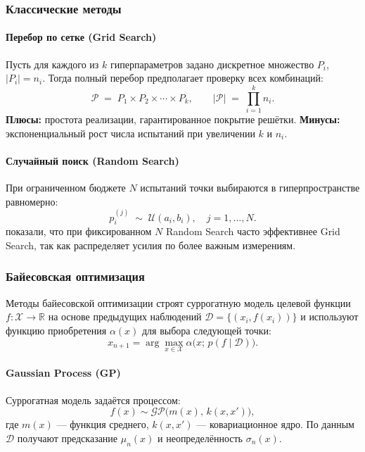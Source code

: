 \subsubsection{Классические методы}

\paragraph{Перебор по сетке (Grid Search)}  
Пусть для каждого из \(k\) гиперпараметров задано дискретное множество \(P_i\), \(|P_i|=n_i\). Тогда полный перебор предполагает проверку всех комбинаций:
\begin{equation}
\mathcal{P} \;=\; P_1 \times P_2 \times \cdots \times P_k,
\qquad
|\mathcal{P}| \;=\; \prod_{i=1}^k n_i.
\label{eq:grid-search-size}
\end{equation}
\textbf{Плюсы:} простота реализации, гарантированное покрытие решётки.  
\textbf{Минусы:} экспоненциальный рост числа испытаний при увеличении \(k\) и \(n_i\).

\paragraph{Случайный поиск (Random Search)}  
При ограниченном бюджете \(N\) испытаний точки выбираются в гиперпространстве равномерно:
\begin{equation}
p_i^{(j)} \;\sim\; \mathcal{U}(a_i, b_i),
\quad j = 1,\dots,N.
\label{eq:random-search}
\end{equation}
\citet{bergstra2012random} показали, что при фиксированном \(N\) Random Search часто эффективнее Grid Search, так как распределяет усилия по более важным измерениям.

\subsubsection{Байесовская оптимизация}

Методы байесовской оптимизации строят суррогатную модель целевой функции
\(
f\colon \mathcal{X}\to\mathbb{R}
\)
на основе предыдущих наблюдений \(\mathcal{D}=\{(x_i, f(x_i))\}\) и используют функцию приобретения \(\alpha(x)\) для выбора следующей точки:
\begin{equation}
x_{n+1} = \arg\max_{x\in\mathcal{X}} \alpha\bigl(x;\,p(f\mid\mathcal{D})\bigr).
\label{eq:bayes-opt}
\end{equation}

\paragraph{Gaussian Process (GP)}  
Суррогатная модель задаётся процессом:
\begin{equation}
f(x)\sim\mathcal{GP}\bigl(m(x),\,k(x,x')\bigr),
\label{eq:gp-prior}
\end{equation}
где \(m(x)\) — функция среднего, \(k(x,x')\) — ковариационное ядро. По данным \(\mathcal{D}\) получают предсказание \(\mu_n(x)\) и неопределённость \(\sigma_n(x)\).

